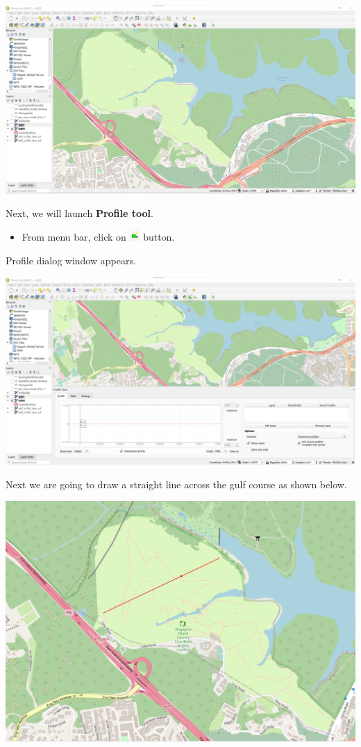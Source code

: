 \documentclass[
  letterpaper,
  DIV=11,
  numbers=noendperiod]{scrreprt}
\providecommand{\tightlist}{%
  \setlength{\itemsep}{0pt}\setlength{\parskip}{0pt}}\usepackage{longtable,booktabs,array}
\begin{document}
\includegraphics{./img06/image69.jpg}

Next, we will launch \textbf{Profile tool}.

\begin{itemize}
\tightlist
\item
  From menu bar, click on
  \includegraphics[width=0.15625in,height=0.16667in]{./img06/image70.jpg}
  button.
\end{itemize}

Profile dialog window appears.

\includegraphics{./img06/image71.jpg}

Next we are going to draw a straight line across the gulf course as
shown below.

\includegraphics{./img06/image72.jpg}
\end{document}
